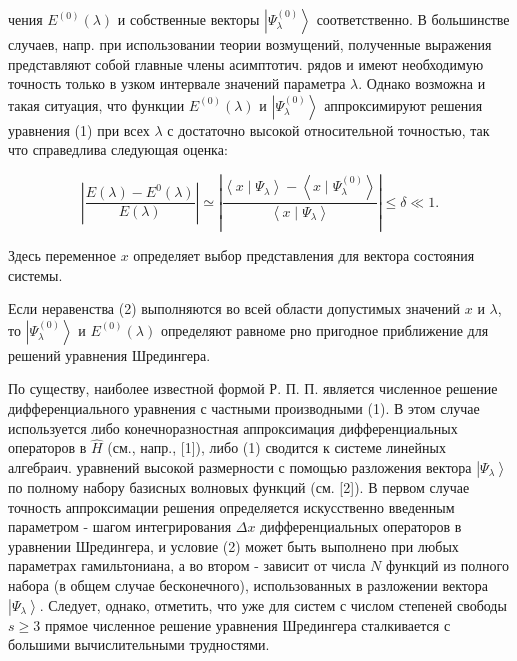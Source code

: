 \documentclass[10pt]{article}
\begin{document}
чения $E^{(0)}(\lambda)$ и собственные векторы $\left|\Psi_{\lambda}^{(0)}\right\rangle$ соответственно. В большинстве случаев, напр. при использовании теории возмущений, полученные выражения представляют собой главные члены асимптотич. рядов и имеют необходимую точность только в узком интервале значений параметра $\lambda$. Однако возможна и такая ситуация, что функции $E^{(0)}(\lambda)$ и $\left|\Psi_{\lambda}^{(0)}\right\rangle$ аппроксимируют решения уравнения (1) при всех $\lambda$ с достаточно высокой относительной точностью, так что справедлива следующая оценка:



\[

\left|\frac{E(\lambda)-E^{0}(\lambda)}{E(\lambda)}\right| \simeq\left|\frac{\left\langle x \mid \Psi_{\lambda}\right\rangle-\left\langle x \mid \Psi_{\lambda}^{(0)}\right\rangle}{\left\langle x \mid \Psi_{\lambda}\right\rangle}\right| \leqslant \delta \ll 1 .

\]



Здесь переменное $x$ определяет выбор представления для вектора состояния системы.



Если неравенства (2) выполняются во всей области допустимых значений $x$ и $\lambda$, то $\left|\Psi_{\lambda}^{(0)}\right\rangle$ и $E^{(0)}(\lambda)$ определяют равноме рно пригодное приближение для решений уравнения Шредингера.



По существу, наиболее известной формой Р. П. П. является численное решение дифференциального уравнения с частными производными (1). В этом случае используется либо конечноразностная аппроксимация дифференциальных операторов в $\hat{H}$ (см., напр., [1]), либо (1) сводится к системе линейных алгебраич. уравнений высокой размерности с помощью разложения вектора $\left|\Psi_{\lambda}\right\rangle$ по полному набору базисных волновых функций (см. [2]). В первом случае точность аппроксимации решения определяется искусственно введенным параметром - шагом интегрирования $\Delta x$ дифференциальных операторов в уравнении Шредингера, и условие (2) может быть выполнено при любых параметрах гамильтониана, а во втором - зависит от числа $N$ функций из полного набора (в общем случае бесконечного), использованных в разложении вектора $\left|\Psi_{\lambda}\right\rangle$. Следует, однако, отметить, что уже для систем с числом степеней свободы $s \geqslant 3$ прямое численное решение уравнения Шредингера сталкивается с большими вычислительными трудностями.
\end{document}
